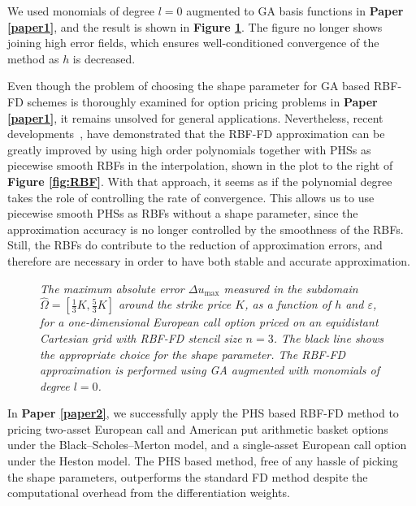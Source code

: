 \documentclass{UUThesisTemplate}
\begin{document}
\par
We used monomials of degree $l=0$ augmented to GA basis functions in \textbf{Paper \ref{paper1}}, and the result is shown in \textbf{Figure \ref{fig:contour2}}. The figure no longer shows joining high error fields, which ensures well-conditioned convergence of the method as $h$ is decreased.
\par
Even though the problem of choosing the shape parameter for GA based RBF-FD schemes is thoroughly examined for option pricing problems in \textbf{Paper \ref{paper1}}, it remains unsolved for general applications. Nevertheless, recent developments~\cite{flyer2016on, bayona2017role}, have demonstrated that the RBF-FD approximation can be greatly improved by using high order polynomials together with PHSs as piecewise smooth RBFs in the interpolation, shown in the plot to the right of \textbf{Figure \ref{fig:RBF}}. With that approach, it seems as if the polynomial degree takes the role of controlling the rate of convergence. This allows us to use piecewise smooth PHSs as RBFs without a shape parameter, since the approximation accuracy is no longer controlled by the smoothness of the RBFs. Still, the RBFs do contribute to the reduction of approximation errors, and therefore are necessary in order to have both stable and accurate approximation.
\begin{figure}[H]
\centering


\caption{\emph{The maximum absolute error $\Delta u_{\max}$ measured in the subdomain $\hat\Omega=[\frac{1}{3}K,\frac{5}{3}K]$ around the strike price $K$, as a function of $h$ and $\varepsilon$, for a one-dimensional European call option priced on an equidistant Cartesian grid with RBF-FD stencil size $n=3$. The black line shows the appropriate choice for the shape parameter. The RBF-FD approximation is performed using GA augmented with monomials of degree $l=0$.}}
\label{fig:contour2}
\end{figure}

\par
In \textbf{Paper \ref{paper2}}, we successfully apply the PHS based RBF-FD method to pricing two-asset European call and American put arithmetic basket options under the Black--Scholes--Merton model, and a single-asset European call option under the Heston model. The PHS based method, free of any hassle of picking the shape parameters, outperforms the standard FD method despite the computational overhead from the differentiation weights.
%
\end{document}
